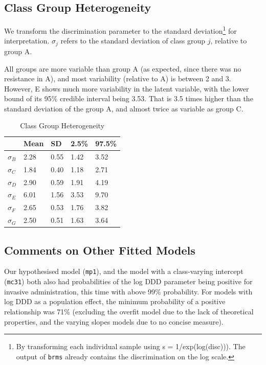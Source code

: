 \documentclass[11pt,twoside]{article}
\numberwithin{Theorem}{section}
\numberwithin{Definition}{section}
\numberwithin{Lemma}{section}
\numberwithin{Algorithm}{section}
\numberwithin{equation}{section}
\begin{document}
\newpage
\subsection{Class Group Heterogeneity}

We transform the discrimination parameter to the standard deviation\footnote{By transforming each individual sample using s = 1/exp(log(disc))). The output of \texttt{brms} already contains the discrimination on the log scale.} for interpretation. $\sigma_j$ refers to the standard deviation of class group $j$, relative to group A. 

All groups are more variable than group A (as expected, since there was no resistance in A), and most variability (relative to A) is between 2 and 3. However, E shows much more variability in the latent variable, with the lower bound of its 95\% credible interval being 3.53. That is 3.5 times higher than the standard deviation of the group A, and almost twice as variable as group C. 

\begin{table}[h!]
	\centering
	\begin{tabular}{lllll}
		\hline
		& Mean & SD & 2.5\% & 97.5\% \\ 
		\hline \hline
		$\sigma_B$ & 2.28 & 0.55 & 1.42 & 3.52 \\ 
		$\sigma_C$ & 1.84 & 0.40 & 1.18 & 2.71 \\ 
		$\sigma_D$ & 2.90 & 0.59 & 1.91 & 4.19 \\ 
		$\sigma_E$ & 6.01 & 1.56 & 3.53 & 9.70 \\ 
		$\sigma_F$ & 2.65 & 0.53 & 1.76 & 3.82 \\ 
		$\sigma_G$ & 2.50 & 0.51 & 1.63 & 3.64 \\ 
		\hline
	\end{tabular}
	\caption{Class Group Heterogeneity} 
	\label{tab::5_Heterogeneity}
\end{table}

\subsection{Comments on Other Fitted Models}

Our hypothesised model (\texttt{mp1}), and the model with a class-varying intercept (\texttt{mc31}) both also had probabilities of the log DDD parameter being positive for invasive administration, this time with above 99\% probability. For models with log DDD as a population effect, the minimum probability of a positive relationship was 71\% (excluding the overfit model due to the lack of theoretical properties, and the varying slopes models due to no concise measure).
\end{document}
